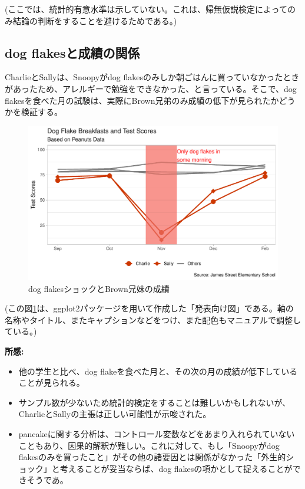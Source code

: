 \documentclass[xelatex,ja=standard]{bxjsarticle}
\begin{document}
(ここでは、統計的有意水準は示していない。これは、帰無仮説検定によってのみ結論の判断をすることを避けるためである。)

\subsection{dog flakesと成績の関係}

CharlieとSallyは、Snoopyがdog flakesのみしか朝ごはんに買っていなかったときがあったため、アレルギーで勉強をできなかった、と言っている。そこで、dog flakesを食べた月の試験は、実際にBrown兄弟のみ成績の低下が見られたかどうかを検証する。

\begin{figure}[h!]
\centering
\includegraphics[width=12cm]{04_analyze/dog_flakes_study/figure/dog_flakes_study.pdf}
\caption{dog flakesショックとBrown兄妹の成績}
\label{fig:img2}
\end{figure}

(この図\ref{fig:img2}は、ggplot2パッケージを用いて作成した「発表向け図」である。軸の名称やタイトル、またキャプションなどをつけ、また配色もマニュアルで調整している。)

\textbf{所感:}
\begin{itemize}
\item 他の学生と比べ、dog flakeを食べた月と、その次の月の成績が低下していることが見られる。
\item サンプル数が少ないため統計的検定をすることは難しいかもしれないが、CharlieとSallyの主張は正しい可能性が示唆された。
\item pancakeに関する分析は、コントロール変数などをあまり入れられていないこともあり、因果的解釈が難しい。これに対して、もし「Snoopyがdog flakesのみを買ったこと」がその他の諸要因とは関係がなかった「外生的ショック」と考えることが妥当ならば、dog flakesの項かとして捉えることができそうであ。

\end{itemize}

\newpage

 

% 
%

%
%
\end{document}
